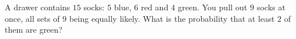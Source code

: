 A drawer contains $15$ socks: $5$ blue, $6$ red and $4$ green. You pull out $9$ socks at once, all sets of $9$ being equally likely. What is the probability that at least $2$ of them are green?
